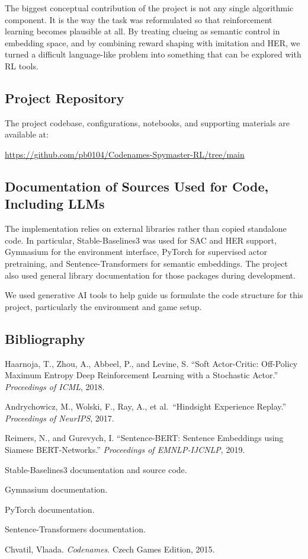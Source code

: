\documentclass[9pt]{article}
\begin{document}
The biggest conceptual contribution of the project is not any single
algorithmic component. It is the way the task was reformulated so that
reinforcement learning becomes plausible at all. By treating clueing as
semantic control in embedding space, and by combining reward shaping
with imitation and HER, we turned a difficult language-like problem into
something that can be explored with RL tools.

\subsection{Project Repository}\label{project-repository}

The project codebase, configurations, notebooks, and supporting
materials are available at:

\url{https://github.com/pb0104/Codenames-Spymaster-RL/tree/main}

\subsection{Documentation of Sources Used for Code, Including
LLMs}\label{documentation-of-sources-used-for-code-including-llms}

The implementation relies on external libraries rather than copied
standalone code. In particular, Stable-Baselines3 was used for SAC and
HER support, Gymnasium for the environment interface, PyTorch for
supervised actor pretraining, and Sentence-Transformers for semantic
embeddings. The project also used general library documentation for
those packages during development.

We used generative AI tools to help guide us formulate the code structure for this project, particularly the environment and game setup.

\subsection{Bibliography}\label{bibliography}
Haarnoja, T., Zhou, A., Abbeel, P., and Levine, S. ``Soft Actor-Critic:
Off-Policy Maximum Entropy Deep Reinforcement Learning with a Stochastic
Actor.'' \emph{Proceedings of ICML}, 2018.

Andrychowicz, M., Wolski, F., Ray, A., et al.~``Hindsight Experience
Replay.'' \emph{Proceedings of NeurIPS}, 2017.

Reimers, N., and Gurevych, I. ``Sentence-BERT: Sentence Embeddings using
Siamese BERT-Networks.'' \emph{Proceedings of EMNLP-IJCNLP}, 2019.

Stable-Baselines3 documentation and source code.

Gymnasium documentation.

PyTorch documentation.

Sentence-Transformers documentation.

Chvatil, Vlaada. \emph{Codenames}. Czech Games Edition, 2015.
\end{document}
